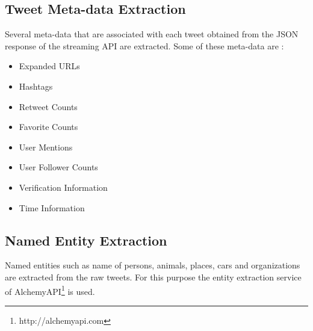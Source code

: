 \subsection{Tweet Meta-data Extraction}
Several meta-data that are associated with each tweet obtained from the JSON response of the streaming API are extracted.  Some of these meta-data are :
\begin{itemize}
\item Expanded URLs  
\item Hashtags 
\item Retweet Counts 
\item Favorite Counts
\item User Mentions
\item User Follower Counts
\item Verification Information
\item Time Information 
\end{itemize}

\subsection{Named Entity Extraction}
Named entities such as name of persons, animals, places, cars and organizations are extracted from the raw tweets. For this purpose the entity extraction service of AlchemyAPI\footnote{http://alchemyapi.com} is used. 



%


